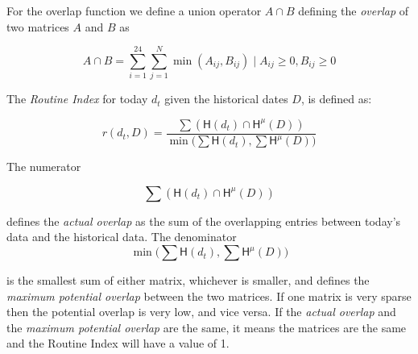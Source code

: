 For the overlap function we define a union operator $A \cap B$ defining the \textit{overlap} of two matrices $A$ and $B$ as 

\begin{equation}
\label{eq:overlap-function}
    A \cap B = \sum_{i=1}^{24} \sum_{j=1}^{N} \min (A_{ij}, B_{ij}) \;|\; A_{ij} \geq 0, B_{ij} \geq 0
\end{equation}

The \textit{Routine Index} for today $d_t$ given the historical dates $D$, is defined as: 

\begin{equation}
\label{eq:feature-routine-index}
r(d_t, D) = \frac{\sum (\mathsf{H}(d_t) \cap \mathsf{H}^{\mu} (D) )}{\min \Big(\sum \mathsf{H}(d_t), \sum \mathsf{H}^{\mu} (D) \Big)}
\end{equation}

The numerator 

\begin{equation}
\label{eq:feature-routine-index-numerator}
\sum (\mathsf{H}(d_t) \cap \mathsf{H}^{\mu} (D) )
\end{equation}

defines the \textit{actual overlap} as the sum of the overlapping entries between today's data and the historical data. The denominator 
\begin{equation}
\label{eq:feature-routine-index-denominator}
\min \Big(\sum \mathsf{H}(d_t), \sum \mathsf{H}^{\mu} (D) \Big)
\end{equation}

is the smallest sum of either matrix, whichever is smaller, and defines the \textit{maximum potential overlap} between the two matrices. If one matrix is very sparse then the potential overlap is very low, and vice versa. If the \textit{actual overlap} and the \textit{maximum potential overlap} are the same, it means the matrices are the same and the Routine Index will have a value of 1. 

